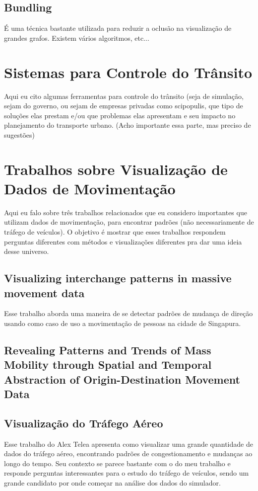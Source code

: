   \subsection{Bundling}
    É uma técnica bastante utilizada para reduzir a oclusão na visualização de grandes
    grafos. Existem vários algoritmos, etc...

\section{Sistemas para Controle do Trânsito}

Aqui eu cito algumas ferramentas para controle do trânsito (seja de simulação, sejam do governo, ou
sejam de empresas privadas como scipopulis, que tipo de soluções elas prestam e/ou
que problemas elas apresentam e seu impacto no planejamento do transporte urbano.
(Acho importante essa parte, mas preciso de sugestões)

\section{Trabalhos sobre Visualização de Dados de Movimentação}

Aqui eu falo sobre três trabalhos relacionados que eu considero importantes que utilizam dados de movimentação,
para encontrar padrões (não necessariamente de tráfego de veículos). O objetivo
é mostrar que esses trabalhos respondem perguntas diferentes com métodos
e visualizações diferentes pra dar uma ideia desse universo.

\subsection{Visualizing interchange patterns in massive movement data}
 Esse trabalho aborda uma maneira de se detectar padrões de mudança de direção
usando como caso de uso a movimentação de pessoas na cidade de Singapura.

\subsection{Revealing Patterns and Trends of Mass Mobility through Spatial
and Temporal Abstraction of Origin-Destination Movement Data}

\subsection{Visualização do Tráfego Aéreo}
 Esse trabalho do Alex Telea apresenta como visualizar uma grande quantidade
de dados do tráfego aéreo, encontrando padrões de congestionamento e mudanças
ao longo do tempo. Seu contexto se parece bastante com o do meu trabalho
e responde perguntas interessantes para o estudo do tráfego de veículos, sendo
um grande candidato por onde começar na análise dos dados do simulador.

